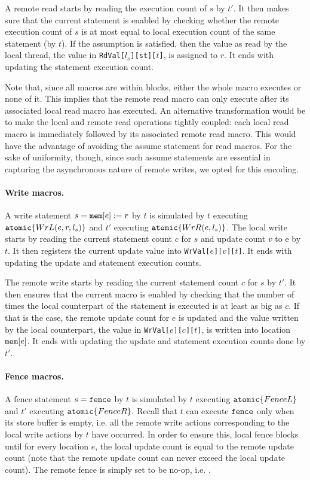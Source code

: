 \documentclass[preprint,9pt]{sigplanconf}
\begin{document}
A remote read starts by reading the execution count of $s$ by $t'$.
It then makes sure that the current statement is enabled by checking whether the remote execution count of $s$ is at most equal to local execution count of the same statement (by $t$).
If the assumption is satisfied, then the value as read by the local thread, the value in {\tt RdVal[$l_s$][st][$t$]}, is assigned to $r$.
It ends with updating the statement execution count.

Note that, since all macros are within {\aliatomic} blocks, either the whole macro executes or none of it. 
This implies that the remote read macro can only execute after its associated local read macro has executed.
An alternative transformation would be to make the local and remote read operations tightly coupled: each local read macro is immediately followed by its associated remote read macro.
This would have the advantage of avoiding the assume statement for read macros.
For the sake of uniformity, though, since such assume statements are essential in capturing the asynchronous nature of remote writes, we opted for this encoding.

\paragraph{Write macros.}
A write statement $s=\mathtt{mem}[e]:=r$ by $t$ is simulated by $t$ executing $\mathtt{atomic}\{WrL(e,r,l_s)\}$ and $t'$ executing $\mathtt{atomic}\{WrR(e,l_s)\}$.
The local write starts by reading the current statement count $c$ for $s$ and update count $v$ to {\alimemx e} by $t$.
It then registers the current update value into {\tt WrVal[$e$][$v$][$t$]}.
It ends with updating the update and statement execution counts.

The remote write starts by reading the current statement count $c$ for $s$ by $t'$.
It then ensures that the current macro is enabled by checking that the number of times the local counterpart of the statement is executed is at least as big as $c$.
If that is the case, the remote update count for $e$ is updated and the value written by the local counterpart, the value in {\tt WrVal[$e$][$c$][$t$]}, is written into location $\mathtt{mem}[e]$.
It ends with updating the update and statement execution counts done by $t'$.

\paragraph{Fence macros.}
A fence statement $s=\mathtt{fence}$ by $t$ is simulated by $t$ executing $\mathtt{atomic}\{FenceL\}$ and $t'$ executing $\mathtt{atomic}\{FenceR\}$.
Recall that $t$ can execute $\mathtt{fence}$ only when its store buffer is empty, i.e. all the remote write actions corresponding to the local write actions by $t$ have occurred.
In order to ensure this, local fence blocks until for every location $e$, the local update count is equal to the remote update count (note that the remote update count can never exceed the local update count). 
The remote fence is simply set to be no-op, i.e. \aliskip.
\end{document}
